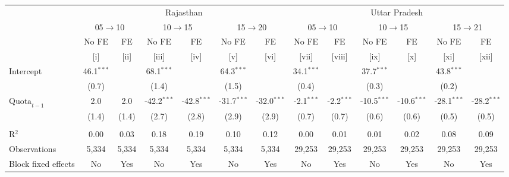 
\begingroup
\centering
\scriptsize
\begin{adjustbox}{max width=\linewidth}
   \begin{threeparttable}[b]
      \begin{tabular}{lcccccccccccc}
         \toprule
          & \multicolumn{6}{c}{Rajasthan} & \multicolumn{6}{c}{Uttar Pradesh} \\
          & \multicolumn{2}{c}{05$\rightarrow$10} & \multicolumn{2}{c}{10$\rightarrow$15} & \multicolumn{2}{c}{15$\rightarrow$20} & \multicolumn{2}{c}{05$\rightarrow$10} & \multicolumn{2}{c}{10$\rightarrow$15} & \multicolumn{2}{c}{15$\rightarrow$21} \\
                               & No FE        & FE    & No FE         & FE            & No FE         & FE            & No FE        & FE           & No FE         & FE            & No FE         & FE \\
                               & [i]          & [ii]  & [iii]         & [iv]          & [v]           & [vi]          & [vii]        & [viii]       & [ix]          & [x]           & [xi]          & [xii]\\
         \midrule
         Intercept             & 46.1$^{***}$ &       & 68.1$^{***}$  &               & 64.3$^{***}$  &               & 34.1$^{***}$ &              & 37.7$^{***}$  &               & 43.8$^{***}$  &   \\
                               & (0.7)        &       & (1.4)         &               & (1.5)         &               & (0.4)        &              & (0.3)         &               & (0.2)         &   \\
         $\text{Quota}_{t-1}$  & 2.0          & 2.0   & -42.2$^{***}$ & -42.8$^{***}$ & -31.7$^{***}$ & -32.0$^{***}$ & -2.1$^{***}$ & -2.2$^{***}$ & -10.5$^{***}$ & -10.6$^{***}$ & -28.1$^{***}$ & -28.2$^{***}$\\
                               & (1.4)        & (1.4) & (2.7)         & (2.8)         & (2.9)         & (2.9)         & (0.7)        & (0.7)        & (0.6)         & (0.6)         & (0.5)         & (0.5)\\
          \\
         R$^2$                 & 0.00         & 0.03  & 0.18          & 0.19          & 0.10          & 0.12          & 0.00         & 0.01         & 0.01          & 0.02          & 0.08          & 0.09\\
         Observations          & 5,334        & 5,334 & 5,334         & 5,334         & 5,334         & 5,334         & 29,253       & 29,253       & 29,253        & 29,253        & 29,253        & 29,253\\
         Block fixed effects   & No           & Yes   & No            & Yes           & No            & Yes           & No           & Yes          & No            & Yes           & No            & Yes\\
         \bottomrule
      \end{tabular}


\end{threeparttable}
\end{adjustbox}
